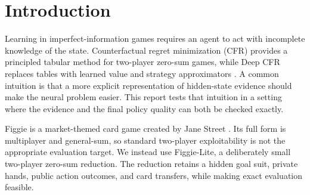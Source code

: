 \maketitle

\begin{abstract}
Deep counterfactual regret minimization (Deep CFR) replaces the information-set tables of counterfactual regret minimization with neural networks. This can be useful when tables are too large, but it also introduces approximation error. We study that trade-off in Figgie-Lite, a two-player zero-sum trading reduction with four hidden goal-suit worlds, private cards, public buy outcomes, and an exact exploitability evaluator. The central intervention is an exact Bayesian card-consistency feature. At each information set it conditions on the player's private hand and on all observed card-transfer outcomes, but it does not assume an opponent action model. We compare Deep CFR with and without this feature, as well as tabular CFR, across five fixed seeds after 2,000 iterations. Exact exploitability is $5.549 \pm 0.364$ for Bayesian Deep CFR, $5.413 \pm 0.404$ without the feature, and $1.090 \pm 0.030$ for tabular CFR. The feature does not improve this small benchmark at the tested budget. The result is a bounded negative finding: exact state evidence alone does not remove the optimization cost of neural regret approximation when the tabular problem is still small.
\end{abstract}

\section{Introduction}

Learning in imperfect-information games requires an agent to act with incomplete knowledge of the state. Counterfactual regret minimization (CFR) provides a principled tabular method for two-player zero-sum games, while Deep CFR replaces tables with learned value and strategy approximators \citep{zinkevich2007regret,brown2019deepcfr}. A common intuition is that a more explicit representation of hidden-state evidence should make the neural problem easier. This report tests that intuition in a setting where the evidence and the final policy quality can both be checked exactly.

Figgie is a market-themed card game created by Jane Street \citep{figgierules}. Its full form is multiplayer and general-sum, so standard two-player exploitability is not the appropriate evaluation target. We instead use Figgie-Lite, a deliberately small two-player zero-sum reduction. The reduction retains a hidden goal suit, private hands, public action outcomes, and card transfers, while making exact evaluation feasible.

